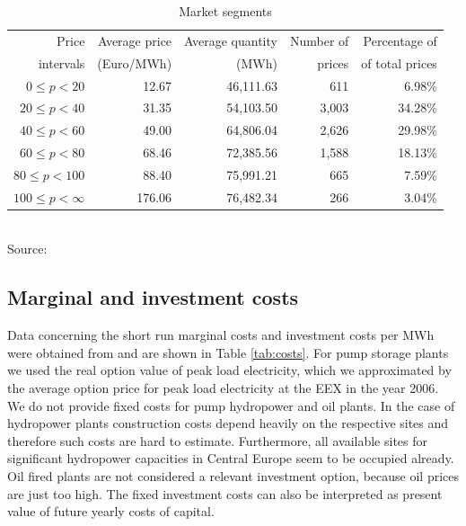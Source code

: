 \begin{table}[ht]
\centering
\caption{Market segments}\label{tab:marketsegments}
\begin{tabular}{rrrrr}
  \hline
Price & Average price  & Average quantity & Number of & Percentage of \\
intervals& (Euro/MWh) &  (MWh) &  prices & of total prices\\
  \hline\hline
$0\leq p<20$ & 12.67 & 46,111.63 & 611 & 6.98\% \\
$20\leq p<40$ & 31.35 & 54,103.50 & 3,003 & 34.28\% \\
$40\leq p<60$ & 49.00 & 64,806.04 & 2,626 & 29.98\% \\
$60\leq p<80$ & 68.46 & 72,385.56 & 1,588 & 18.13\% \\
$80\leq p<100$ & 88.40 & 75,991.21 & 665 & 7.59\% \\
$100\leq p<\infty$& 176.06 & 76,482.34 & 266 & 3.04\% \\
   \hline
\end{tabular}
\\
\vspace{0.3cm}
\scriptsize Source: \cite{EEX2006, UCTE2006}
\end{table}

\subsection{Marginal and investment costs}
\label{sec:marg-investm-costs}

Data concerning the short run marginal costs and investment costs per MWh were obtained from \cite{Auer2006} and are shown in Table \ref{tab:costs}. For pump storage plants we used the real option value of peak load electricity, which we approximated by the average option price for peak load electricity at the EEX in the year 2006. We do not provide fixed costs for pump hydropower and oil plants. In the case of hydropower plants construction costs depend heavily on the respective sites and therefore such costs are hard to estimate. Furthermore, all available sites for significant hydropower capacities in Central Europe seem to be occupied already. Oil fired plants are not considered a relevant investment option, because oil prices are just too high. The fixed investment costs can also be interpreted as present value of future yearly costs of capital.

